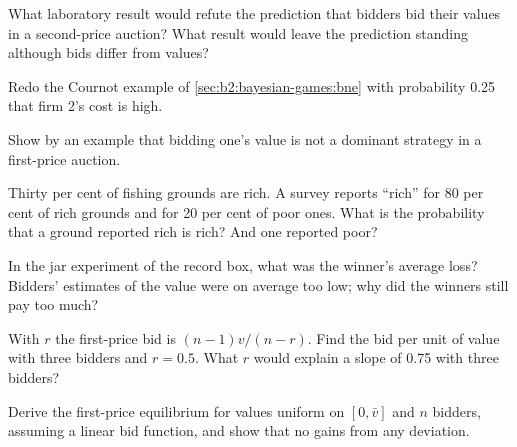 \begin{exercise}[$\star$]\label{exo:b2:bayesian-games:4}
What laboratory result would refute the prediction that bidders bid their values in a second-price auction? What
result would leave the prediction standing although bids differ from values?
\end{exercise}

\begin{exercise}[$\star\star$]\label{exo:b2:bayesian-games:5}
Redo the Cournot example of \cref{sec:b2:bayesian-games:bne} with probability 0.25 that firm 2's cost is high.
\end{exercise}

\begin{exercise}[$\star\star$]\label{exo:b2:bayesian-games:6}
Show by an example that bidding one's value is not a dominant strategy in a first-price auction.
\end{exercise}

\begin{exercise}[$\star\star$]\label{exo:b2:bayesian-games:7}
Thirty per cent of fishing grounds are rich. A survey reports ``rich'' for 80 per cent of rich grounds and for 20 per
cent of poor ones. What is the probability that a ground reported rich is rich? And one reported poor?
\end{exercise}

\begin{exercise}[$\star\star$]\label{exo:b2:bayesian-games:8}
In the jar experiment of the record box, what was the winner's average loss? Bidders' estimates of the value were
on average too low; why did the winners still pay too much?
\end{exercise}

\begin{exercise}[$\star\star$]\label{exo:b2:bayesian-games:9}
With  $r$ the first-price bid is $(n - 1)v/(n - r)$. Find the bid per unit of value with three
bidders and $r = 0.5$. What $r$ would explain a slope of 0.75 with three bidders?
\end{exercise}

\begin{exercise}[$\star\star\star$]\label{exo:b2:bayesian-games:10}
Derive the first-price equilibrium for values uniform on $[0, \bar v]$ and $n$ bidders, assuming a linear bid function, and show
that no  gains from any deviation.
\end{exercise}

